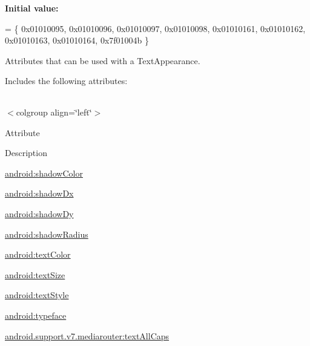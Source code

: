 {\bfseries Initial value\+:}
\begin{DoxyCode}
= \{
            0x01010095, 0x01010096, 0x01010097, 0x01010098,
            0x01010161, 0x01010162, 0x01010163, 0x01010164,
            0x7f01004b
        \}
\end{DoxyCode}
Attributes that can be used with a Text\+Appearance. 

Includes the following attributes\+:

\tabulinesep=1mm
\begin{longtabu} spread 0pt [c]{*{0}{|X[-1]}|}
\hline
\end{longtabu}
$<$colgroup align=\char`\"{}left\char`\"{}$>$ 

Attribute

Description 

{\ttfamily \hyperlink{classandroid_1_1support_1_1v7_1_1mediarouter_1_1R_1_1styleable_a6b97baff4bc894f0d6c987535d7f3a5a}{android\+:shadow\+Color}}

{\ttfamily \hyperlink{classandroid_1_1support_1_1v7_1_1mediarouter_1_1R_1_1styleable_a81de478b4358f0d70081daf1c09c22be}{android\+:shadow\+Dx}}

{\ttfamily \hyperlink{classandroid_1_1support_1_1v7_1_1mediarouter_1_1R_1_1styleable_a89a0ca76b46147ac109fdca933ba7ae0}{android\+:shadow\+Dy}}

{\ttfamily \hyperlink{classandroid_1_1support_1_1v7_1_1mediarouter_1_1R_1_1styleable_aaa832bf0610d5cc0cce43c775bdea573}{android\+:shadow\+Radius}}

{\ttfamily \hyperlink{classandroid_1_1support_1_1v7_1_1mediarouter_1_1R_1_1styleable_a650b9a9477f454927072818d18f15b8c}{android\+:text\+Color}}

{\ttfamily \hyperlink{classandroid_1_1support_1_1v7_1_1mediarouter_1_1R_1_1styleable_a9988f4dbc2f3276bd7a8362c792b2fff}{android\+:text\+Size}}

{\ttfamily \hyperlink{classandroid_1_1support_1_1v7_1_1mediarouter_1_1R_1_1styleable_a2af45fccc46df62e5eebf47ba223c488}{android\+:text\+Style}}

{\ttfamily \hyperlink{classandroid_1_1support_1_1v7_1_1mediarouter_1_1R_1_1styleable_a39493f01673ec164f3f21508901be8ef}{android\+:typeface}}

{\ttfamily \hyperlink{classandroid_1_1support_1_1v7_1_1mediarouter_1_1R_1_1styleable_ab8377ae9b2955b9b7e3a0ac98b305840}{android.\+support.\+v7.\+mediarouter\+:text\+All\+Caps}}


